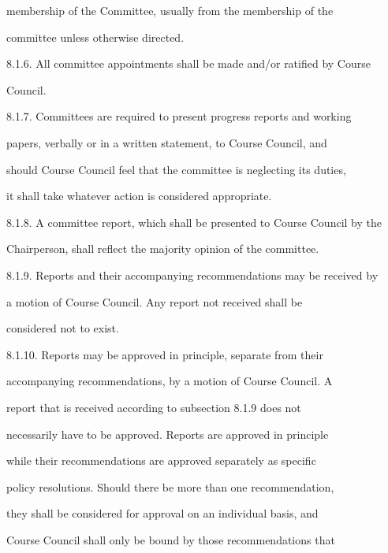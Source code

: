         membership  of  the  Committee,  usually  from  the  membership  of  the  

        committee unless otherwise directed.  



8.1.6. All committee  appointments  shall  be  made  and/or  ratified  by  Course  

        Council.  



8.1.7. Committees  are  required  to  present  progress  reports  and  working  

        papers,  verbally  or  in  a  written  statement,  to  Course  Council,  and  

        should Course Council feel that the committee is neglecting its duties,  

        it shall take whatever action is considered appropriate.  



8.1.8. A committee report, which shall be presented to Course Council by the  

        Chairperson, shall reflect the majority opinion of the committee.  



8.1.9. Reports and their accompanying recommendations may be received by  

        a   motion   of   Course   Council.   Any   report   not   received   shall   be  

        considered not to exist.  



8.1.10.     Reports     may     be   approved      in   principle,     separate    from     their  

        accompanying  recommendations,  by  a  motion  of  Course  Council.  A  

        report   that   is   received   according   to   subsection   8.1.9   does   not  

        necessarily  have  to  be  approved.  Reports  are  approved  in  principle  

        while   their   recommendations   are  approved   separately   as   specific  

        policy  resolutions.  Should  there  be  more  than  one  recommendation,  

        they  shall  be  considered  for  approval  on  an  individual  basis,  and  

        Course  Council  shall  only  be  bound  by  those  recommendations  that  

